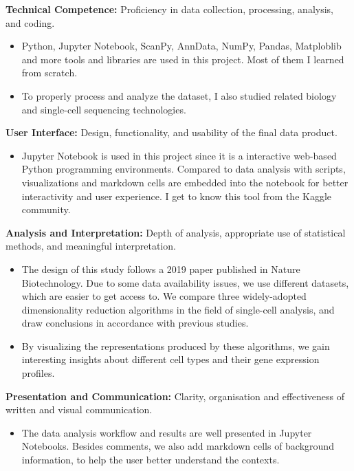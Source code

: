 \documentclass[a4paper, 12pt]{article}
\begin{document}
\textbf{Technical Competence:} Proficiency in data collection, processing, analysis, and coding.

\begin{itemize}
    \item Python, Jupyter Notebook, ScanPy, AnnData, NumPy, Pandas, Matploblib and more tools and libraries are used in this project. Most of them I learned from scratch.
    \item To properly process and analyze the dataset, I also studied related biology and single-cell sequencing technologies.
\end{itemize}

\textbf{User Interface:} Design, functionality, and usability of the final data product.

\begin{itemize}
    \item Jupyter Notebook is used in this project since it is a interactive web-based Python programming environments. Compared to data analysis with scripts, visualizations and markdown cells are embedded into the notebook for better interactivity and user experience. I get to know this tool from the Kaggle community.
\end{itemize}

\textbf{Analysis and Interpretation:} Depth of analysis, appropriate use of statistical methods, and meaningful interpretation.

\begin{itemize}
    \item The design of this study follows a 2019 paper published in Nature Biotechnology. Due to some data availability issues, we use different datasets, which are easier to get access to. We compare three widely-adopted dimensionality reduction algorithms in the field of single-cell analysis, and draw conclusions in accordance with previous studies.
    \item By visualizing the representations produced by these algorithms, we gain interesting insights about different cell types and their gene expression profiles. 
\end{itemize}

\textbf{Presentation and Communication:} Clarity, organisation and effectiveness of written and visual communication.

\begin{itemize}
    \item The data analysis workflow and results are well presented in Jupyter Notebooks. Besides comments, we also add markdown cells of background information, to help the user better understand the contexts.
\end{itemize}
\end{document}
